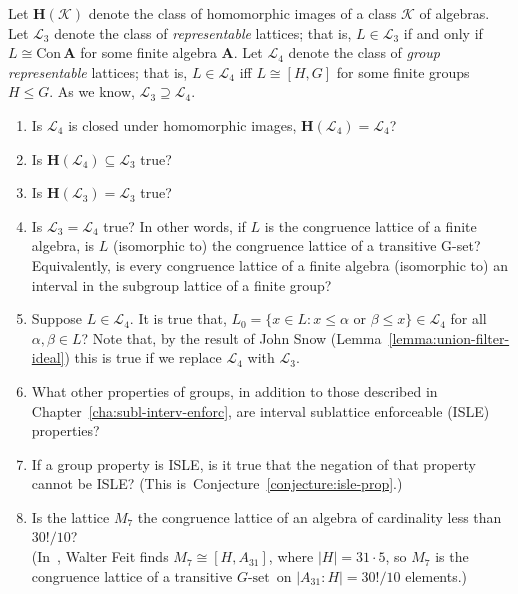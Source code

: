 \documentclass[cm,dissertation,actual,final]{uhthesis}
\theoremstyle{plain}
\theoremstyle{definition}
\newcounter{conjecture}
\theoremstyle{remark}
\numberwithin{theorem}{section}
\numberwithin{claim}{chapter}
\numberwithin{equation}{section}
\numberwithin{conjecture}{chapter}
\newcommand{\<}{\ensuremath{\langle}}
\renewcommand{\>}{\ensuremath{\rangle}}
\renewcommand{\leq}{\ensuremath{\leqslant}}
\newcommand{\Con}{\ensuremath{\mathrm{Con\,}}}
\newcommand{\0}{\ensuremath{\mathbf{0}}}
\newcommand{\1}{\ensuremath{\mathbf{1}}}
\newcommand{\2}{\ensuremath{\mathbf{2}}}
\newcommand{\3}{\ensuremath{\mathbf{3}}}
\newcommand{\4}{\ensuremath{\mathbf{4}}}
\newcommand{\5}{\ensuremath{\mathbf{5}}}
\newcommand{\bA}{\ensuremath{\mathbf{A}}}
\newcommand{\bH}{\ensuremath{\mathbf{H}}}
\newcommand{\sK}{\ensuremath{\mathscr{K}}}
\newcommand{\sL}{\ensuremath{\mathscr{L}}}
\newcommand{\Gset}{\ensuremath{G\text{-set}}}
\begin{document}
Let $\bH(\sK)$ denote the class of homomorphic images of a class $\sK$
of algebras.
Let $\sL_3$ denote the class of 
\emph{representable} lattices; that is,
$L \in \sL_3$ if and only if $L \cong \Con \bA$ for some finite algebra $\bA$.
Let $\sL_{4}$ denote the class of 
\emph{group representable} lattices; that is, $L \in \sL_{4}$ iff $L\cong [H, G]$ for some
finite groups $H\leq G$.
As we know, $\sL_3 \supseteq \sL_4$.
\begin{enumerate}
\item  Is $\sL_4$ is closed under homomorphic images, $\bH(\sL_4) = \sL_4$?  

\item Is $\bH(\sL_4) \subseteq \sL_3$ true?

\item Is $\bH(\sL_3) = \sL_3$ true?

\item Is $\sL_3 = \sL_4$ true?
In other words, if $L$ is %
the congruence lattice of a finite
algebra, is $L$ (isomorphic to) the congruence lattice of a transitive G-set?
Equivalently, is every congruence lattice of a finite algebra (isomorphic to) an
interval in the subgroup lattice of a finite group?  

\item Suppose $L \in \sL_4$. %
It is true that, 
$L_0 = \{ x\in L : x \leq \alpha \text{ or } \beta \leq x \} \in \sL_4$
for all $\alpha, \beta \in L$?  Note that, by the result of 
%
John Snow (Lemma~\ref{lemma:union-filter-ideal}) 
this is true if we replace $\sL_4$ with $\sL_3$.

\item What other properties of groups, in addition to those described in
  Chapter~\ref{cha:subl-interv-enforc}, are interval sublattice enforceable
  (ISLE) properties?

\item If a group property is ISLE, is it true that the negation of that property cannot be ISLE?
(This is~Conjecture~\ref{conjecture:isle-prop}.)

\item Is the lattice $M_7$ the congruence lattice of an algebra of cardinality
  less than $30!/10$?\\
(In~\cite{Feit:1983},  
%
Walter Feit finds $M_7 \cong [H,A_{31}]$, where
  $|H|=31\cdot 5$, so $M_7$ is the congruence lattice of a transitive \Gset\ on
  $|A_{31}:H| = 30!/10$ elements.)


\end{enumerate}
\end{document}
